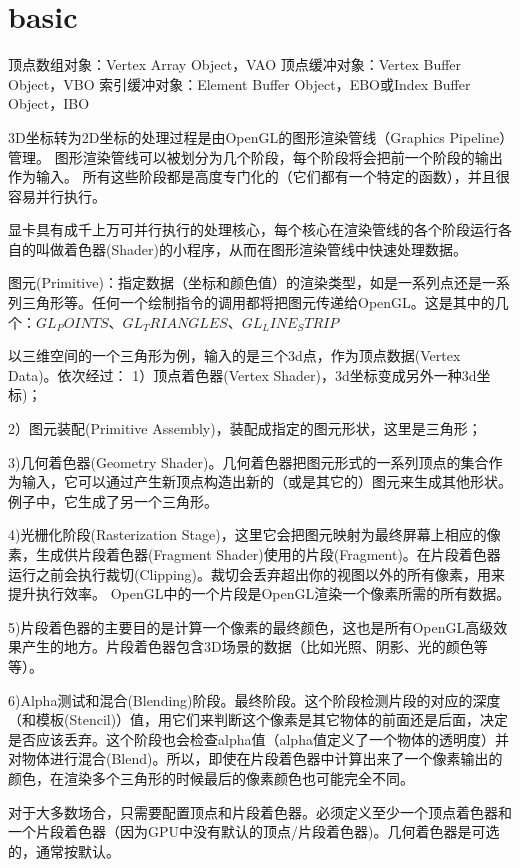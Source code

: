 \documentclass[UTF8]{article}
\begin{document}

\section{basic}

顶点数组对象：Vertex Array Object，VAO
顶点缓冲对象：Vertex Buffer Object，VBO
索引缓冲对象：Element Buffer Object，EBO或Index Buffer Object，IBO

3D坐标转为2D坐标的处理过程是由OpenGL的图形渲染管线（Graphics Pipeline）管理。
图形渲染管线可以被划分为几个阶段，每个阶段将会把前一个阶段的输出作为输入。
所有这些阶段都是高度专门化的（它们都有一个特定的函数），并且很容易并行执行。

显卡具有成千上万可并行执行的处理核心，每个核心在渲染管线的各个阶段运行各自的叫做着色器(Shader)的小程序，从而在图形渲染管线中快速处理数据。


图元(Primitive)：指定数据（坐标和颜色值）的渲染类型，如是一系列点还是一系列三角形等。任何一个绘制指令的调用都将把图元传递给OpenGL。这是其中的几个：$GL_POINTS、GL_TRIANGLES、GL_LINE_STRIP$

以三维空间的一个三角形为例，输入的是三个3d点，作为顶点数据(Vertex Data)。依次经过：
1）顶点着色器(Vertex Shader)，3d坐标变成另外一种3d坐标)；

2）图元装配(Primitive Assembly)，装配成指定的图元形状，这里是三角形；

3)几何着色器(Geometry Shader)。几何着色器把图元形式的一系列顶点的集合作为输入，它可以通过产生新顶点构造出新的（或是其它的）图元来生成其他形状。例子中，它生成了另一个三角形。

4)光栅化阶段(Rasterization Stage)，这里它会把图元映射为最终屏幕上相应的像素，生成供片段着色器(Fragment Shader)使用的片段(Fragment)。在片段着色器运行之前会执行裁切(Clipping)。裁切会丢弃超出你的视图以外的所有像素，用来提升执行效率。
OpenGL中的一个片段是OpenGL渲染一个像素所需的所有数据。

5)片段着色器的主要目的是计算一个像素的最终颜色，这也是所有OpenGL高级效果产生的地方。片段着色器包含3D场景的数据（比如光照、阴影、光的颜色等等）。

6)Alpha测试和混合(Blending)阶段。最终阶段。这个阶段检测片段的对应的深度（和模板(Stencil)）值，用它们来判断这个像素是其它物体的前面还是后面，决定是否应该丢弃。这个阶段也会检查alpha值（alpha值定义了一个物体的透明度）并对物体进行混合(Blend)。所以，即使在片段着色器中计算出来了一个像素输出的颜色，在渲染多个三角形的时候最后的像素颜色也可能完全不同。

对于大多数场合，只需要配置顶点和片段着色器。必须定义至少一个顶点着色器和一个片段着色器（因为GPU中没有默认的顶点/片段着色器)。几何着色器是可选的，通常按默认。
\end{document}
